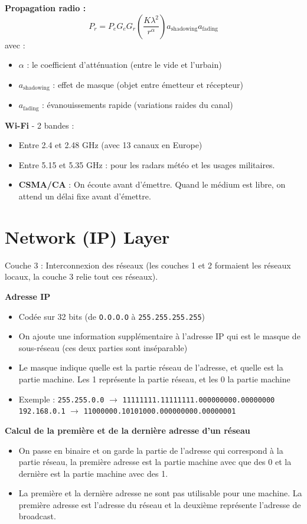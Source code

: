 \documentclass[a4paper,9pt, twocolumn]{article}
\begin{document}
	\textbf{Propagation radio : } 
	$$P_{r} = P_{e} G_{e} G_{r} \left( \frac{K\lambda^{2}}{r^{\alpha}} \right) a_{\text{shadowing}} a_{\text{fading}}$$
	avec : 
	\begin{itemize}
		\item $\alpha$ : le coefficient d'atténuation (entre le vide et l'urbain)
		\item $a_{\text{shadowing}}$ : effet de masque (objet entre émetteur et récepteur)
		\item $a_{\text{fading}}$ : évanouissements rapide (variations raides du canal)
	\end{itemize}
	
	\textbf{Wi-Fi} - 2 bandes : 
	\begin{itemize}
		\item Entre 2.4 et 2.48 GHz (avec 13 canaux en Europe)
		\item Entre 5.15 et 5.35 GHz : pour les radars météo et les usages militaires.
		\item \textbf{CSMA/CA} : On écoute avant d'émettre.
			Quand le médium est libre, on attend un délai fixe avant d'émettre.
	\end{itemize}
	
	
\section*{Network (IP) Layer}

	Couche 3 : Interconnexion des réseaux (les couches 1 et 2 formaient les réseaux locaux, la couche 3 relie tout ces réseaux).
	
	\textbf{Adresse IP}
	\begin{itemize}
		\item Codée sur 32 bits (de \texttt{O.O.O.O} à \texttt{255.255.255.255})
		\item On ajoute une information supplémentaire à l'adresse IP qui est le masque de sous-réseau (ces deux parties sont inséparable)
		\item Le masque indique quelle est la partie réseau de l'adresse, et quelle est la partie machine. Les 1 représente la partie réseau, et les 0 la partie machine
		\item Exemple : 
		\texttt{255.255.0.0} $\longrightarrow$ \texttt{11111111.11111111.000000000.00000000}
		\texttt{192.168.0.1} $\longrightarrow$ \texttt{11000000.10101000.000000000.00000001}
	\end{itemize}

	\textbf{Calcul de la première et de la dernière adresse d'un réseau}
	\begin{itemize}
		\item On passe en binaire et on garde la partie de l'adresse qui correspond à la partie réseau, la première adresse est la partie machine avec que des 0 et la dernière est la partie machine avec des 1.
		\item La première et la dernière adresse ne sont pas utilisable pour une machine. La première adresse est l'adresse du réseau et la deuxième représente l'adresse de broadcast.
	\end{itemize}
	
\end{document}
